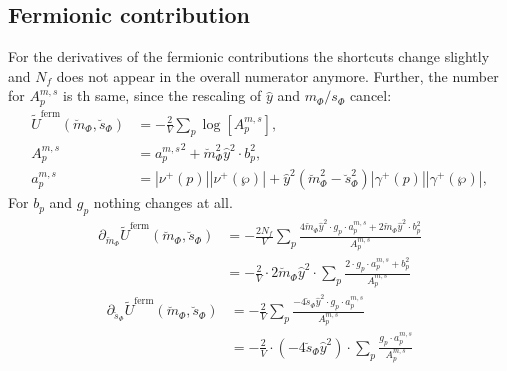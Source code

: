 \subsection*{Fermionic contribution}
For the derivatives of the fermionic contributions the shortcuts change slightly and $N_f$ does not appear in the overall numerator anymore. Further, the number 
for $A_p^{m,s}$ is th same, since the rescaling of $\hat y$ and $m_{\Phi}/s_{\Phi}$ cancel:
\begin{align}\label{eq:CEP_ferionicContribution_shortcuts_rescaled}
 \tilde U^{\text{ferm}}(\breve m_{\Phi}, \breve s_{\Phi}) & = - \frac{2}{V} \sum\limits_p \log\left[{A_p^{m, s}}\right],
%  
          \\ \label{eq:CEP_ferionicContribution_shortcuts_A_rescaled}
 {A_p^{m, s}} &= {a_p^{m,s}}^2 +  \breve m_{\Phi}^2 \hat y^2 \cdot b_p^2 ,
%  
          \\ \label{eq:CEP_ferionicContribution_shortcuts_a_rescaled}
 {a_p^{m,s}} &= |\nu^+(p)| |\nu^+(\wp)|   +   \hat y ^2 \left( \breve m_{\Phi}^2 - \breve s_{\Phi}^2 \right) |\gamma^+(p)| |\gamma^+(\wp)|,
\end{align}
For $b_p$ and $g_p$ nothing changes at all.
% 
\begin{align}\label{eq:CEP_derivative_dm_fermionicContribution_rescaled}
 \partial_{\breve m_{\Phi}}  \tilde U^{\text{ferm}}(\breve m_{\Phi}, \breve s_{\Phi}) & =
                                -\frac{2N_f}{V} \sum\limits_p \frac{4 \breve m_{\Phi} \hat y^2 \cdot g_p \cdot {a_p^{m,s}}  
                                +  2 \breve m_{\Phi} \hat y^2 \cdot b_p^2} { {A_p^{m, s}} } 
       \nonumber \\
                              & = - \frac{2}{V} \cdot 2 \breve m_{\Phi} \hat y^2 \cdot \sum\limits_p 
                                  \frac{2 \cdot g_p \cdot {a_p^{m,s}} + b_p^2}{ {A_p^{m, s}} }
\end{align} 
% 
\begin{align}\label{eq:CEP_derivative_ds_fermionicContribution_rescaled}
 \partial_{\breve s_{\Phi}}  \tilde U^{\text{ferm}}(\breve m_{\Phi}, \breve s_{\Phi}) &= 
                              - \frac{2}{V} \sum\limits_p \frac{- 4 \breve s_{\Phi} \hat y^2 \cdot g_p \cdot {a_p^{m,s}} }{ {A_p^{m, s}} } 
       \nonumber \\
                            & = - \frac{2}{V} \cdot \left( -4 \breve s_{\Phi} \hat y^2\right) \cdot \sum\limits_p 
                                \frac{ g_p \cdot {a_p^{m,s}} }{ {A_p^{m, s}} }
\end{align} 
